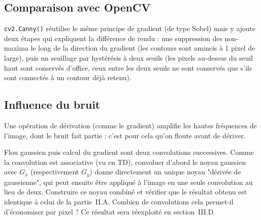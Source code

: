 \subsection{Comparaison avec OpenCV}

\texttt{cv2.Canny()} réutilise le même principe de gradient (de type Sobel) mais y ajoute deux étapes qui expliquent la différence de rendu : une suppression des non-maxima le long de la direction du gradient (les contours sont amincis à 1 pixel de large), puis un seuillage par hystérésis à deux seuils (les pixels au-dessus du seuil haut sont conservés d'office, ceux entre les deux seuils ne sont conservés que s'ils sont connectés à un contour déjà retenu).



\subsection{Influence du bruit}
\label{sec:bruit}

Une opération de dérivation (comme le gradient) amplifie les hautes fréquences de l'image, dont le bruit fait partie : c'est pour cela qu'on floute avant de dériver. \\




\begin{shortcut}
Flou gaussien puis calcul du gradient sont deux convolutions successives. Comme la convolution est associative (vu en TD), convoluer d'abord le noyau gaussien avec $G_x$ (respectivement $G_y$) donne directement un unique noyau "dérivée de gaussienne", qui peut ensuite être appliqué à l'image en une seule convolution au lieu de deux. Construire ce noyau combiné et vérifier que le résultat obtenu est identique à celui de la partie~II.A. Combien de convolutions cela permet-il d'économiser par pixel ? Ce résultat sera réexploité en section~III.D.
\end{shortcut}


